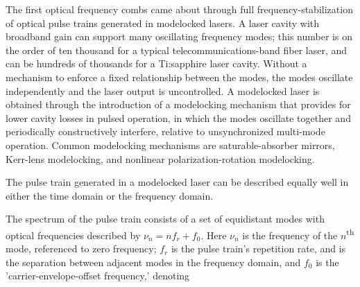 The first optical frequency combs came about through full frequency-stabilization of optical pulse trains generated in modelocked lasers. A laser cavity with broadband gain can support many oscillating frequency modes; this number is on the order of ten thousand for a typical telecommunications-band fiber laser, and can be hundreds of thousands for a Ti:sapphire laser cavity. Without a mechanism to enforce a fixed relationship between the modes, the modes oscillate independently and the laser output is uncontrolled. A modelocked laser is obtained through the introduction of a modelocking mechanism that provides for lower cavity losses in pulsed operation, in which the modes oscillate together and periodically constructively interfere, relative to unsynchronized multi-mode operation. Common modelocking mechanisms are saturable-absorber mirrors, Kerr-lens modelocking, and nonlinear polarization-rotation modelocking.

The pulse train generated in a modelocked laser can be described equally well in either the time domain or the frequency domain. 


The spectrum of the pulse train consists of a set of equidistant modes with optical frequencies described by $\nu_n=nf_r+f_0$. Here $\nu_n$ is the frequency of the $n$\textsuperscript{th} mode, referenced to zero frequency; $f_r$ is the pulse train's repetition rate, and is the separation between adjacent modes in the frequency domain, and $f_0$ is the 'carrier-envelope-offset frequency,' denoting 


